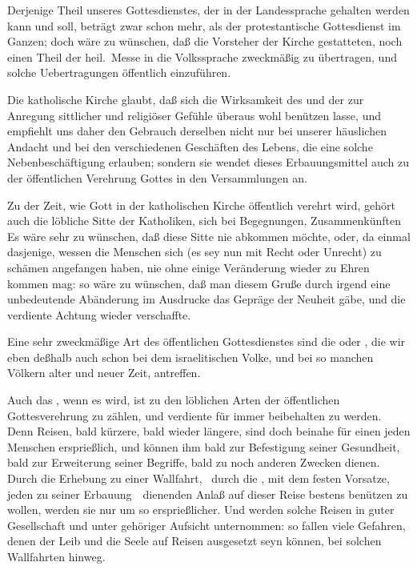 \begin{aufza}
{Derjenige Theil unseres Gottesdienstes, der in der Landessprache gehalten werden kann und soll, beträgt zwar schon mehr, als der protestantische Gottesdienst im Ganzen; doch wäre zu wünschen, daß die Vorsteher der Kirche gestatteten, noch einen Theil der heil.\ Messe in die Volkssprache zweckmäßig zu übertragen, und solche Uebertragungen öffentlich einzuführen.}~
\item Die katholische Kirche glaubt, daß sich die Wirksamkeit des  und der  zur Anregung sittlicher und religiöser Gefühle überaus wohl benützen lasse, und empfiehlt uns daher den Gebrauch derselben nicht nur bei unserer häuslichen Andacht und bei den verschiedenen Geschäften des Lebens, die eine solche Nebenbeschäftigung erlauben; sondern sie wendet dieses Erbauungsmittel auch zu der öffentlichen Verehrung Gottes in den Versammlungen an.
\item Zu der Zeit, wie Gott in der katholischen Kirche öffentlich verehrt wird, gehört auch die löbliche Sitte der Katholiken, sich bei Begegnungen, Zusammenkünften \udgl\   Es wäre sehr zu wünschen, daß diese Sitte nie abkommen möchte, oder, da einmal dasjenige, wessen die Menschen sich (es sey nun mit Recht oder Unrecht) zu schämen angefangen haben, nie ohne einige Veränderung wieder zu Ehren kommen mag: so wäre zu wünschen, daß man diesem Gruße durch irgend eine unbedeutende Abänderung im Ausdrucke das Gepräge der Neuheit gäbe, und die verdiente Achtung wieder verschaffte.

\item Eine sehr zweckmäßige Art des öffentlichen Gottesdienstes sind die  oder , die wir eben deßhalb auch schon bei dem israelitischen Volke, und bei so manchen Völkern alter und neuer Zeit, antreffen.
\item Auch das , wenn es  wird, ist zu den löblichen Arten der öffentlichen Gottesverehrung zu zählen, und verdiente für immer beibehalten zu werden. Denn Reisen, bald kürzere, bald wieder längere, sind doch beinahe für einen jeden Menschen ersprießlich, und können ihm bald zur Befestigung seiner Gesundheit, bald zur Erweiterung seiner Begriffe, bald zu noch anderen Zwecken dienen. Durch die Erhebung zu einer Wallfahrt, \dh\  durch die , mit dem festen Vorsatze, jeden zu seiner Erbauung~\ dienenden Anlaß auf dieser Reise bestens benützen zu wollen, werden sie nur um so ersprießlicher. Und werden solche Reisen in guter Gesellschaft und unter gehöriger Aufsicht unternommen: so fallen viele Gefahren, denen der Leib und die Seele auf Reisen ausgesetzt seyn können, bei solchen Wallfahrten hinweg.
\end{aufza}
